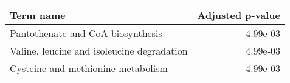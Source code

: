 \begin{tabular}{lr}
\toprule
                                 Term name &  Adjusted p-value \\
\midrule
         Pantothenate and CoA biosynthesis &          4.99e-03 \\
Valine, leucine and isoleucine degradation &          4.99e-03 \\
        Cysteine and methionine metabolism &          4.99e-03 \\
\bottomrule
\end{tabular}
